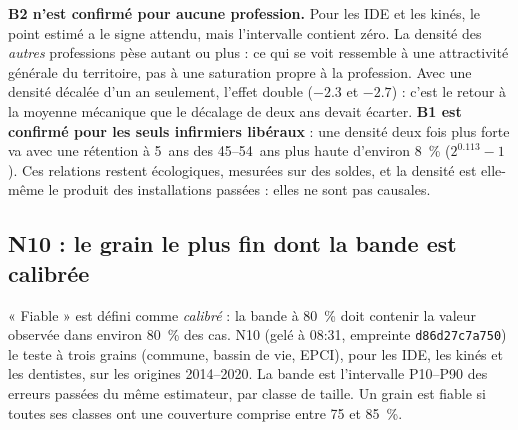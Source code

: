 \textbf{B2 n'est confirmé pour aucune profession.} Pour les IDE et les kinés, le point estimé a le
signe attendu, mais l'intervalle contient zéro. La densité des \emph{autres} professions pèse
autant ou plus : ce qui se voit ressemble à une attractivité générale du territoire, pas à une
saturation propre à la profession. Avec une densité décalée d'un an seulement, l'effet double
($\num{-2.3}$ et $\num{-2.7}$\mesure{}) : c'est le retour à la moyenne mécanique que le décalage de deux
ans devait écarter. \textbf{B1 est confirmé pour les seuls infirmiers libéraux} : une densité deux fois
plus forte va avec une rétention à 5~ans des 45--54~ans plus haute d'environ
8\derive{}~\% ($2^{0.113} - 1$). Ces relations restent écologiques, mesurées sur des soldes, et la
densité est elle-même le produit des installations passées : elles ne sont pas causales.

\subsection{N10 : le grain le plus fin dont la bande est calibrée}
« Fiable » est défini comme \emph{calibré} : la bande à 80~\% doit contenir la valeur observée dans
environ 80~\% des cas. N10 (gelé à 08:31, empreinte \texttt{d86d27c7a750}) le teste à trois grains
(commune, bassin de vie, EPCI), pour les IDE, les kinés et les dentistes, sur les origines
2014--2020. La bande est l'intervalle P10--P90 des erreurs passées du même estimateur, par classe de
taille. Un grain est fiable si toutes ses classes ont une couverture comprise entre 75 et 85~\%.

